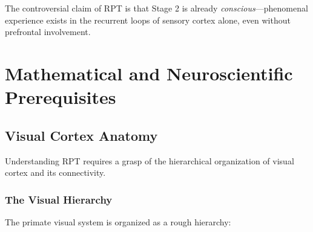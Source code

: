 \documentclass[11pt,a4paper]{report}
\begin{document}
The controversial claim of RPT is that Stage 2 is already \emph{conscious}---phenomenal experience exists in the recurrent loops of sensory cortex alone, even without prefrontal involvement.


\chapter{Mathematical and Neuroscientific Prerequisites}

\section{Visual Cortex Anatomy}

Understanding RPT requires a grasp of the hierarchical organization of visual cortex and its connectivity.

\subsection{The Visual Hierarchy}

The primate visual system is organized as a rough hierarchy:
\end{document}
